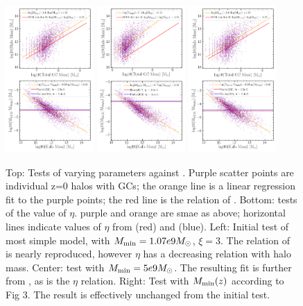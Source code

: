 \documentclass[onecolumn]{aastex62}
\begin{document}
\begin{figure}[!htb]
\centering
\includegraphics[width=0.3\textwidth]{GCtest_initial_simple.png}
\includegraphics[width=0.3\textwidth]{GCtest_tree_Mmin_5e9.png}
\includegraphics[width=0.3\textwidth]{GCtest_tree_varying_minmass.png}
\caption{\small{Top: Tests of varying parameters against \cite{Spitler&Forbes2009}.  Purple scatter points are individual z=0 halos with GCs; the orange line is a linear regression fit to the purple points; the red line is the relation of \cite{Spitler&Forbes2009}.  Bottom: tests of the value of $\eta$.  purple and orange are smae as above; horizontal lines indicate values of $\eta$ from \cite{Harris2017} (red) and \cite{Forbes2016} (blue).
Left: Initial test of most simple model, with $M_{\rm{min}} = 1.07e9 M_\odot$, $\xi = 3$.  The relation of \cite{Spitler&Forbes2009} is nearly reproduced, however $\eta$ has a decreasing relation with halo mass.  Center: test with $M_{\rm{min}} = 5e9 M_\odot$.  The resulting fit is further from \cite{Spitler&Forbes2009}, as is the $\eta$ relation.  Right: Test with $M_{\rm{min}}(z)$ according to  Fig 3.  The result is effectively unchanged from the initial test.}}
\label{fig:initial_results}
\end{figure}
\end{document}
